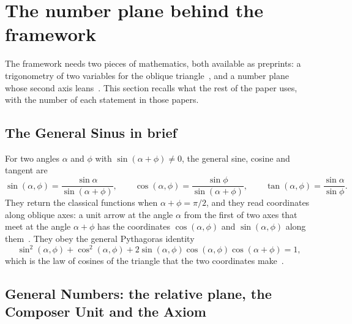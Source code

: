 \section{The number plane behind the framework}\label{sec:plane}

The framework needs two pieces of mathematics, both available as preprints: a trigonometry of two variables for the oblique triangle~\citep{Derraz2026GSP}, and a number plane whose second axis leans~\citep{DerrazGN2026}. This section recalls what the rest of the paper uses, with the number of each statement in those papers.

\subsection{The General Sinus in brief}\label{subsec:gs}

For two angles $\alpha$ and $\phi$ with $\sin(\alpha + \phi) \neq 0$, the general sine, cosine and tangent are~\citep[Definition~3.6 and Theorem~3.7]{Derraz2026GSP}
\begin{equation}\label{eq:gs}
\sin(\alpha, \phi) = \frac{\sin\alpha}{\sin(\alpha + \phi)} , \qquad
\cos(\alpha, \phi) = \frac{\sin\phi}{\sin(\alpha + \phi)} , \qquad
\tan(\alpha, \phi) = \frac{\sin\alpha}{\sin\phi} .
\end{equation}
They return the classical functions when $\alpha + \phi = \pi/2$, and they read coordinates along oblique axes: a unit arrow at the angle $\alpha$ from the first of two axes that meet at the angle $\alpha + \phi$ has the coordinates $\cos(\alpha, \phi)$ and $\sin(\alpha, \phi)$ along them~\citep[Corollary~2.3 and Proposition~2.4]{DerrazGN2026}. They obey the general Pythagoras identity
\begin{equation}\label{eq:gs-pythagoras}
\sin^2(\alpha, \phi) + \cos^2(\alpha, \phi) + 2\sin(\alpha, \phi)\cos(\alpha, \phi)\cos(\alpha + \phi) = 1 ,
\end{equation}
which is the law of cosines of the triangle that the two coordinates make~\citep[Proposition~2.6]{DerrazGN2026}.

\subsection{General Numbers: the relative plane, the Composer Unit and the Axiom}\label{subsec:gn}

